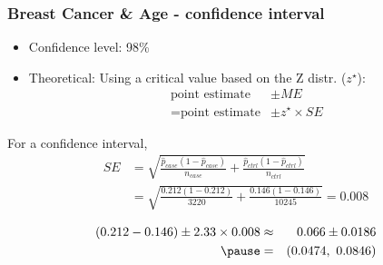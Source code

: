 \documentclass[11pt,containsverbatim,handout,xcolor=xelatex,dvipsnames,table]{beamer}
\begin{document}

\begin{frame}
\frametitle{Breast Cancer \& Age - confidence interval}

\begin{itemize}

\item Confidence level: 98\%

\pause

\item Theoretical: Using a critical value based on the Z distr. ($z^\star$):
\begin{align*} 
\text{point estimate} &\pm ME \\
= \text{point estimate} &\pm z^\star \times SE
\end{align*}

\end{itemize}

\pause

For a confidence interval, 
\begin{align*}
SE &= \sqrt{\frac{\hat{p}_{case}(1-\hat{p}_{case})}{n_{case}} + \frac{\hat{p}_{ctrl}(1-\hat{p}_{ctrl})}{n_{ctrl}} } \\
   &= \sqrt{\frac{0.212(1-0.212)}{3220} + \frac{0.146(1-0.146)}{10245}} = 0.008 
\end{align*}
\pause

\begin{eqnarray*}
(0.212 - 0.146) \pm 2.33 \times 0.008 &\approx& 0.066 \pm 0.0186 \\
\pause
&=& (0.0474,~0.0846)
\end{eqnarray*}

\end{frame}
\end{document}

